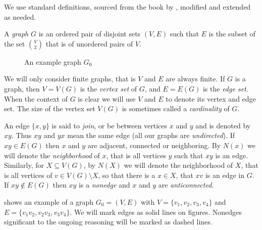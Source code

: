We use standard definitions, sourced from the book by \citeauthor{BB98} , modified and extended as needed.

\begin{defn}[graph]
  A \emph{graph} $G$ is an ordered pair of disjoint sets $(V, E)$ such that $E$ is the subset of the set $V \choose 2$ that is of unordered pairs of $V$.
\end{defn}

\begin{wrapfigure}{r}{0.4\textwidth}
  \centering{}
  \caption{An example graph $G_0$}
  \label{fig:examplePath}
\end{wrapfigure}

We will only consider finite graphs, that is $V$ and $E$ are always finite. If $G$ is a graph, then $V = V(G)$ is the \emph{vertex set} of $G$, and $E = E(G)$ is the \emph{edge set}. When the context of $G$ is clear we will use $V$ and $E$ to denote its vertex and edge set. The size of the vertex set $V(G)$ is sometimes called a \emph{cardinality} of $G$.

An edge $\{x, y\}$ is said to \emph{join}, or be between vertices $x$ and $y$ and is denoted by $xy$. Thus $xy$ and $yx$ mean the same edge (all our graphs are \emph{undirected}). If $xy \in E(G)$ then $x$ and $y$ are adjacent, connected or neighboring. By $N(x)$ we will denote the \emph{neighborhood} of $x$, that is all vertices $y$ such that $xy$ is an edge. Similarly, for $X \subseteq V(G)$, by $N(X)$ we will denote the neighborhood of $X$, that is all vertices of $v \in V(G) \setminus X$, so that there is a $x \in X$, that $xv$ is an edge in $G$. If $xy \notin E(G)$ then $xy$ is a \emph{nonedge} and $x$ and $y$ are \emph{anticonnected}.

 shows an example of a graph $G_0 = (V, E)$ with $V = \{v_1, v_2, v_3, v_4\}$ and $E = \{v_1v_2, v_2v_3, v_3v_4\}$. We will mark edges as solid lines on figures. Nonedges significant to the ongoing reasoning will be marked as dashed lines.

